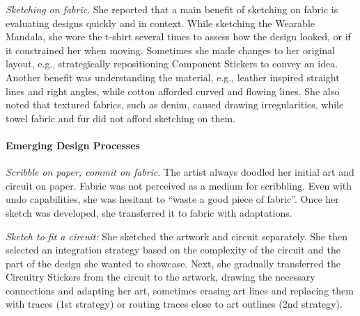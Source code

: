 \documentclass[header.tex]{subfiles}
\begin{document}




\textit{Sketching on fabric}. She reported that a main benefit of sketching on fabric is evaluating designs quickly and in context. While sketching the Wearable Mandala, she wore the t-shirt several times to assess how the design looked, or if it constrained her when moving. Sometimes she made changes to her original layout, e.g., strategically repositioning Component Stickers to convey an idea. Another benefit was understanding the material, e.g., leather inspired straight lines and right angles, while cotton afforded curved and flowing lines. She also noted that textured fabrics, such as denim, caused drawing irregularities, while towel fabric and fur did not afford sketching on them. 





\paragraph{Emerging Design Processes}
\textit{Scribble on paper, commit on fabric}. The artist always doodled her initial art and circuit on paper. Fabric was not perceived as a medium for scribbling. Even with undo capabilities, she was hesitant to ``waste a good piece of fabric''. Once her sketch was developed, she transferred it to fabric with adaptations.

\textit{Sketch to fit a circuit:} She sketched the artwork and circuit separately. She then selected an integration strategy based on the complexity of the circuit and the part of the design she wanted to showcase. Next, she gradually transferred the Circuitry Stickers from the circuit to the artwork, drawing the necessary connections and adapting her art, sometimes erasing art lines and replacing them with traces (1st strategy) or routing traces close to art outlines (2nd strategy).

\end{document}
